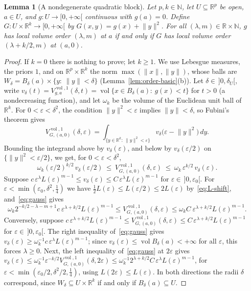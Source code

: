 \documentclass[11pt,a4paper]{article}
\newtheorem{lemma}[theorem]{Lemma}
\theoremstyle{definition}
\theoremstyle{remark}
\numberwithin{equation}{section}
\newcommand{\N}{\mathbb{N}}
\newcommand{\R}{\mathbb{R}}
\newcommand{\vol}{\operatorname{vol}}
\newcommand{\norm}[1]{\lVert #1\rVert}
\newcommand{\eps}{\varepsilon}
\begin{document}
\begin{lemma}[A nondegenerate quadratic block]\label{lem:gauss}
Let $p,k\in\N$, let $U\subseteq\R^p$ be open, $a\in U$, and $g:U\to[0,+\infty[$ continuous with $g(a)=0$. Define $G:U\times\R^k\to[0,+\infty[$ by $G(x,y)=g(x)+\norm y^2$. For all $(\lambda,m)\in\R\times\N$, $g$ has local volume order $(\lambda,m)$ at $a$ if and only if $G$ has local volume order $(\lambda+k/2,m)$ at $(a,0)$.
\end{lemma}
\begin{proof}
If $k=0$ there is nothing to prove; let $k\ge1$. We use Lebesgue measures, the priors $1$, and on $\R^p\times\R^k$ the norm $\max(\norm x,\norm y)$, whose balls are $W_\delta=B_\delta(a)\times\{y:\ \norm y<\delta\}$ (Lemma~\ref{lem:order-basic}(b)). Let $\delta\in\,]0,\delta_U[$, write $v_\delta(t)=V^{\vol,1}_{g,a}(\delta,t)=\vol\{x\in B_\delta(a):\ g(x)<t\}$ for $t>0$ (a nondecreasing function), and let $\omega_k$ be the volume of the Euclidean unit ball of $\R^k$. For $0<\eps<\delta^2$, the condition $\norm y^2<\eps$ implies $\norm y<\delta$, so Fubini's theorem gives
\[
V^{\vol,1}_{G,(a,0)}(\delta,\eps)=\int_{\{y\in\R^k:\ \norm y^2<\eps\}}v_\delta\bigl(\eps-\norm y^2\bigr)\,dy .
\]
Bounding the integrand above by $v_\delta(\eps)$, and below by $v_\delta(\eps/2)$ on $\{\norm y^2<\eps/2\}$, we get, for $0<\eps<\delta^2$,
\begin{equation}\label{eq:gauss}
\omega_k(\eps/2)^{k/2}\,v_\delta(\eps/2)\ \le\ V^{\vol,1}_{G,(a,0)}(\delta,\eps)\ \le\ \omega_k\,\eps^{k/2}\,v_\delta(\eps).
\end{equation}
Suppose $c\,\eps^\lambda L(\eps)^{m-1}\le v_\delta(\eps)\le C\,\eps^\lambda L(\eps)^{m-1}$ for $\eps\in\,]0,\eps_0[$. For $\eps<\min(\eps_0,\delta^2,\frac{1}{4})$ we have $\frac{1}{2}L(\eps)\le L(\eps/2)\le2L(\eps)$ by~\eqref{eq:L-shift}, and~\eqref{eq:gauss} gives
\[
\omega_k2^{-k/2-\lambda-m+1}c\ \eps^{\lambda+k/2}L(\eps)^{m-1}\le V^{\vol,1}_{G,(a,0)}(\delta,\eps)\le\omega_kC\ \eps^{\lambda+k/2}L(\eps)^{m-1}.
\]
Conversely, suppose $c\,\eps^{\lambda+k/2}L(\eps)^{m-1}\le V^{\vol,1}_{G,(a,0)}(\delta,\eps)\le C\,\eps^{\lambda+k/2}L(\eps)^{m-1}$ for $\eps\in\,]0,\eps_0[$. The right inequality of~\eqref{eq:gauss} gives $v_\delta(\eps)\ge\omega_k^{-1}c\,\eps^\lambda L(\eps)^{m-1}$; since $v_\delta(\eps)\le\vol B_\delta(a)<+\infty$ for all $\eps$, this forces $\lambda\ge0$. Next, the left inequality of~\eqref{eq:gauss} at $2\eps$ gives $v_\delta(\eps)\le\omega_k^{-1}\eps^{-k/2}V^{\vol,1}_{G,(a,0)}(\delta,2\eps)\le\omega_k^{-1}2^{\lambda+k/2}C\,\eps^\lambda L(\eps)^{m-1}$, for $\eps<\min(\eps_0/2,\delta^2/2,\frac{1}{4})$, using $L(2\eps)\le L(\eps)$. In both directions the radii $\delta$ correspond, since $W_\delta\subseteq U\times\R^k$ if and only if $B_\delta(a)\subseteq U$.
\end{proof}
\end{document}
